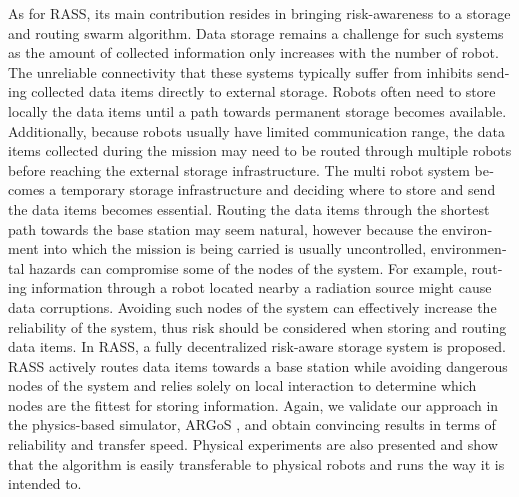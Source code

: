 \begin{otherlanguage}{english}
As for RASS, its main contribution resides in bringing risk-awareness to a storage and routing swarm algorithm. Data storage remains a challenge for such systems as the amount of collected information only increases with the number of robot. The unreliable connectivity that these systems typically suffer from \cite{amigoni2017multirobot} inhibits sending collected data items directly to external storage. Robots often need to store locally the data items until a path towards permanent storage becomes available. Additionally, because robots usually have limited communication range, the data items collected during the mission may need to be routed through multiple robots before reaching the external storage infrastructure. The multi robot system becomes a temporary storage infrastructure and deciding where to store and send the data items becomes essential. Routing the data items through the shortest path towards the base station may seem natural, however because the environment into which the mission is being carried is usually uncontrolled, environmental hazards can compromise some of the nodes of the system. For example, routing information through a robot located nearby a radiation source might cause data corruptions. Avoiding such nodes of the system can effectively increase the reliability of the system, thus risk should be considered when storing and routing data items. In RASS, a fully decentralized risk-aware storage system is proposed. RASS actively routes data items towards a base station while avoiding dangerous nodes of the system and relies solely on local interaction to determine which nodes are the fittest for storing information. Again, we validate our approach in the physics-based simulator, ARGoS \cite{Pinciroli:SI2012}, and obtain convincing results in terms of reliability and transfer speed. Physical experiments are also presented and show that the algorithm is easily transferable to physical robots and runs the way it is intended to.  


\end{otherlanguage}
